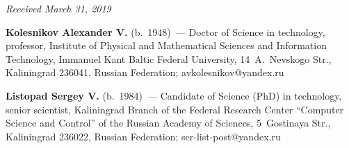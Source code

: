 \begin{multicols}{2}
{{\begin{thebibliography}{99}
\end{thebibliography}

 }
 }

\end{multicols}

\vspace*{-6pt}

\hfill{\small\textit{Received March 31, 2019}}


  
  \Contr
  
  
  \noindent
  \textbf{Kolesnikov Alexander V.} (b.\ 1948)~--- Doctor of Science in 
technology, professor, Institute of Physical and Mathematical Sciences and 
Information Technology, Immanuel Kant Baltic Federal University, 
14~A.~Nevskogo Str., Kaliningrad 236041, Russian Federation; 
\mbox{avkolesnikov@yandex.ru} 
  
  \vspace*{3pt}
  
  \noindent
  \textbf{Listopad Sergey V.} (b.\ 1984)~--- Candidate of  Science (PhD) in 
technology, senior scientist, Kaliningrad Branch of the Federal Research Center 
``Computer Science and Control'' of the Russian Academy of Sciences, 5~Gostinaya 
Str., Kaliningrad 236022, Russian Federation; \mbox{ser-list-post@yandex.ru }
  
  
\label{end\stat}

\renewcommand{\bibname}{\protect\rm Литература}  